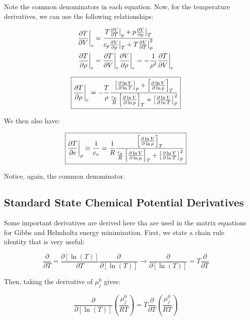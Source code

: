 \documentclass[10pt]{article}
\begin{document}
\begin{flushleft}
Note the common denominators in each equation. Now, for the temperature derivatives, we can use the following relationships:

\begin{align*}
    \frac{\partial T}{\partial V}\bigg|_e &= \frac{T \frac{\partial V}{\partial T}\big|_p + p \frac{\partial V}{\partial p}\big|_T}{c_p \frac{\partial V}{\partial p}\big|_T + T \frac{\partial V}{\partial T}\big|_p^2} \\
    \frac{\partial T}{\partial \rho}\bigg|_e &= \frac{\partial T}{\partial V}\bigg|_e \frac{\partial V}{\partial \rho}\bigg|_e = -\frac{1}{\rho^2} \frac{\partial T}{\partial V}\bigg|_e
\end{align*}

\begin{equation*}
    \boxed{\frac{\partial T}{\partial \rho}\bigg|_e = -\frac{T}{\rho} \frac{\left[ \frac{\partial \ln V}{\partial \ln T} \right]_p + \left[ \frac{\partial \ln V}{\partial \ln p} \right]_T }{\frac{c_p}{R} \left[ \frac{\partial \ln V}{\partial \ln p} \right]_T + \left[ \frac{\partial \ln V}{\partial \ln T} \right]_p^2}}
\end{equation*}

We then also have:

\begin{equation*}
    \boxed{\frac{\partial T}{\partial e}\bigg|_\rho \equiv \frac{1}{c_v} = \frac{1}{R} \frac{\left[ \frac{\partial \ln V}{\partial \ln p} \right]_T}{\frac{c_p}{R} \left[ \frac{\partial \ln V}{\partial \ln p} \right]_T + \left[ \frac{\partial \ln V}{\partial \ln T} \right]_p^2}}
\end{equation*}

Notice, again, the common denominator. 


\subsection{Standard State Chemical Potential Derivatives}

Some important derivatives are derived here tha are used in the matrix equations for Gibbs and Helmholtz energy minimization. First, we state a chain rule identity that is very useful:

\begin{equation}
    \frac{\partial}{\partial T} = \frac{\partial [\ln (T)]}{\partial T} \frac{\partial}{\partial [\ln(T)]} \rightarrow \frac{\partial}{\partial [\ln(T)]} = T \frac{\partial}{\partial T}
    \label{dTID}
\end{equation}

Then, taking the derivative of $\mu_j^0$ gives:

\begin{equation}
    \frac{\partial}{\partial [\ln(T)]} \left( \frac{\mu_j^0}{RT} \right)  = T \frac{\partial }{\partial T} \left( \frac{\mu_j^0}{RT} \right)
\end{equation}


\end{flushleft}
\end{document}
